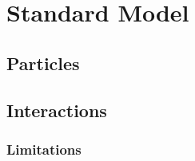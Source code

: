 \chapter{Standard Model}

\label{ch:standardmodel}

\section{Particles}


\section{Interactions}


\subsection{Limitations}

